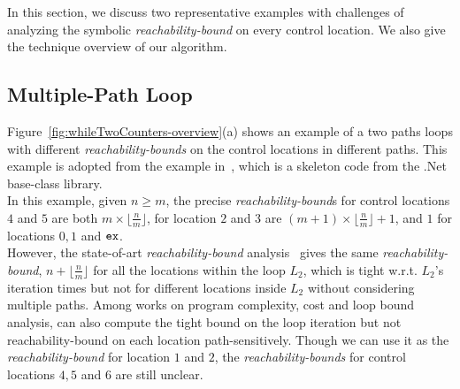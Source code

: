 In this section, we discuss two representative examples with
challenges of analyzing the symbolic
\emph{reachability-bound} on
every control location.
We also give the technique overview of our algorithm.
%
\subsection{Multiple-Path Loop}
\label{sec:overview-multiplepath}

Figure~\ref{fig:whileTwoCounters-overview}(a) shows an example of a two paths loops
with different \emph{reachability-bounds} on the control locations in different paths.
This example is adopted from the example in~\cite{GulwaniZ10}, which
is a skeleton code from the .Net base-class library.
\\
In this example, given $n \geq m$,
the precise \emph{reachability-bound}s for control locations $4$ and $5$ are both $m \times \lfloor\frac{n}{m}\rfloor$,
for location $2$ and $3$ are $(m + 1) \times \lfloor\frac{n}{m}\rfloor + 1$, 
and $1$ for locations $0, 1$ and $\mathtt{ex}$. 
\\
However, the state-of-art \emph{reachability-bound} analysis~\cite{GulwaniZ10}
gives the same \emph{reachability-bound}, $n + \lfloor\frac{n}{m}\rfloor$ for all the locations within the loop $L_2$, which is tight w.r.t. $L_2$'s iteration times but not for different locations inside $L_2$ without considering multiple paths.
Among works on program complexity, cost and loop bound analysis, \cite{GulwaniJK09} can also compute the tight bound on the loop iteration but not reachability-bound on each location path-sensitively.
Though we can use it as the \emph{reachability-bound} for location $1$ and $2$,
the \emph{reachability-bounds} for control locations $4, 5$ and $6$ are still unclear.


